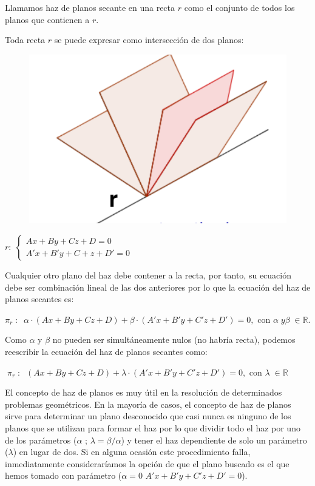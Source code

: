 \begin{multicols}{2}
\noindent Llamamos haz de planos secante en una recta $r$ como el conjunto de todos los planos que contienen a $r$.

\noindent Toda recta $r$ se puede expresar como intersección de dos planos:

	\begin{figure}[H]
		\centering
		\includegraphics[width=.35\textwidth]{imagenes/imagenes10/T10IM13.png}
 	\end{figure}
\end{multicols}
\noindent $r:\; \begin{cases} Ax+By+Cz+D=0\\A'x+B'y+C+z+D'=0 \end{cases}$

\noindent Cualquier otro plano del haz debe contener a la recta, por tanto, su ecuación debe ser combinación lineal de las dos anteriores por lo que la ecuación del haz de planos secantes es:

\noindent $\pi_r\; : \;\; \alpha \cdot (Ax+By+Cz+D)+\beta \cdot (A'x+B'y+C'z+D')=0,  \text{ con } \alpha \; y \beta \;  \in \mathbb R$. 

\noindent Como $\alpha$ y $\beta$ no pueden ser simultáneamente nulos (no habría recta), podemos reescribir la ecuación del haz de planos secantes como:

\vspace{3mm}\noindent $\boxed{\; \pi_r\; : \;\;   (Ax+By+Cz+D)+\lambda \cdot (A'x+B'y+C'z+D')=0,  \text{ con } \lambda \;  \in \mathbb R \;}$

\vspace{3mm}\noindent  El concepto de haz de planos es muy útil en la resolución de determinados problemas geométricos. En la mayoría de casos, el concepto de haz de planos sirve para determinar un plano desconocido que casi nunca es ninguno de los planos que se utilizan para formar el haz por lo que dividir todo el haz por uno de los parámetros ($\alpha$ \textcolor{gris}{; $\lambda=\beta / \alpha$}) y tener el haz dependiente de solo un parámetro ($\lambda$) en lugar de dos. Si en alguna ocasión este procedimiento falla, inmediatamente consideraríamos la opción de que el plano buscado es el que hemos tomado con parámetro ($\alpha=0$ \textcolor{gris}{$A'x+B'y+C'z+D'=0$}).

